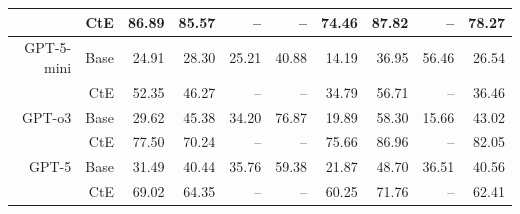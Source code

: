 \begin{table}[!t]
\begin{tabular}{r r !{\color{white!80!black} \vline} r r r r r !{\color{white!80!black} \vline} r r r}
 & CtE & \textcolor{blue!60!black}{86.89} & \textcolor{blue!60!black}{85.57} & \textcolor{blue!60!black}{--} & \textcolor{blue!60!black}{--} & \textcolor{blue!60!black}{74.46} & \textcolor{blue!60!black}{87.82} & \textcolor{blue!60!black}{--} & \textcolor{blue!60!black}{78.27} \\ \midrule
 \sf GPT-5-mini & Base & \textcolor{blue!60!black}{24.91} & \textcolor{blue!60!black}{28.30} & \textcolor{blue!60!black}{25.21} & \textcolor{blue!60!black}{40.88} & \textcolor{blue!60!black}{14.19} & \textcolor{blue!60!black}{36.95} & \textcolor{blue!60!black}{56.46} & \textcolor{blue!60!black}{26.54} \\
 & CtE & \textcolor{blue!60!black}{52.35} & \textcolor{blue!60!black}{46.27} & \textcolor{blue!60!black}{--} & \textcolor{blue!60!black}{--} & \textcolor{blue!60!black}{34.79} & \textcolor{blue!60!black}{56.71} & \textcolor{blue!60!black}{--} & \textcolor{blue!60!black}{36.46} \\ \midrule
 \sf GPT-o3 & Base & \textcolor{blue!60!black}{29.62} & \textcolor{blue!60!black}{45.38} & \textcolor{blue!60!black}{34.20} & \textcolor{blue!60!black}{76.87} & \textcolor{blue!60!black}{19.89} & \textcolor{blue!60!black}{58.30} & \textcolor{blue!60!black}{15.66} & \textcolor{blue!60!black}{43.02} \\
 & CtE & \textcolor{blue!60!black}{77.50} & \textcolor{blue!60!black}{70.24} & \textcolor{blue!60!black}{--} & \textcolor{blue!60!black}{--} & \textcolor{blue!60!black}{75.66} & \textcolor{blue!60!black}{86.96} & \textcolor{blue!60!black}{--} & \textcolor{blue!60!black}{82.05} \\ \midrule
 \sf GPT-5 & Base & \textcolor{blue!60!black}{31.49} & \textcolor{blue!60!black}{40.44} & \textcolor{blue!60!black}{35.76} & \textcolor{blue!60!black}{59.38} & \textcolor{blue!60!black}{21.87} & \textcolor{blue!60!black}{48.70} & \textcolor{blue!60!black}{36.51} & \textcolor{blue!60!black}{40.56} \\
 & CtE & \textcolor{blue!60!black}{69.02} & \textcolor{blue!60!black}{64.35} & \textcolor{blue!60!black}{--} & \textcolor{blue!60!black}{--} & \textcolor{blue!60!black}{60.25} & \textcolor{blue!60!black}{71.76} & \textcolor{blue!60!black}{--} & \textcolor{blue!60!black}{62.41} \\ 
\bottomrule
\end{tabular}
\label{tab:cRi+}
\end{table}

